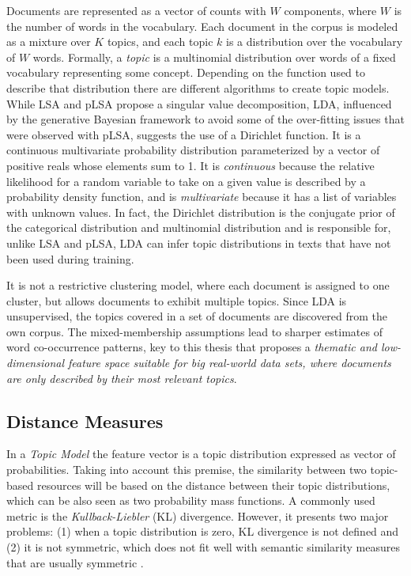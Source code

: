 Documents are represented as a vector of counts with $W$ components, where $W$ is the number of words in the vocabulary. Each document in the corpus is modeled as a mixture over $K$ topics, and each topic $k$ is a distribution over the vocabulary of $W$ words. Formally, a \textit{topic} is a multinomial distribution over words of a fixed vocabulary representing some concept. Depending on the function used to describe that distribution there are different algorithms to create topic models. While LSA and pLSA propose a singular value decomposition, LDA, influenced by the generative Bayesian framework to avoid some of the over-fitting issues that were observed with pLSA, suggests the use of a Dirichlet function. It is a continuous multivariate probability distribution parameterized by a vector of positive reals whose elements sum to 1.  It is \textit{continuous} because the relative likelihood for a random variable to take on a given value is described by a probability density function, and is \textit{multivariate} because it has a list of variables with unknown values. In fact, the Dirichlet distribution is the conjugate prior of the categorical distribution and multinomial distribution and is responsible for, unlike LSA and pLSA, LDA can infer topic distributions in texts that have not been used during training.

It is not a restrictive clustering model, where each document is assigned to one cluster, but allows documents to exhibit multiple topics. Since LDA is unsupervised, the topics covered in a set of documents are discovered from the own corpus. The mixed-membership assumptions lead to sharper estimates of word co-occurrence patterns, key to this thesis that proposes a \textit{thematic and low-dimensional feature space suitable for big real-world data sets, where documents are only described by their most relevant topics}.


\subsection{Distance Measures}

In a \textit{Topic Model} the feature vector is a topic distribution expressed as vector of probabilities. Taking into account this premise, the similarity between two topic-based resources will be based on the distance between their topic distributions, which can be also seen as two probability mass functions. A commonly used metric is the \textit{Kullback-Liebler} (KL) divergence. However, it presents two major problems: (1) when a topic distribution is zero, KL divergence is not defined and (2) it is not symmetric, which does not fit well with semantic similarity measures that are usually symmetric \cite{Rus2013}.


